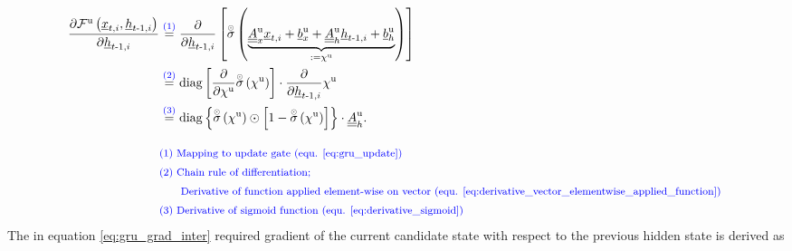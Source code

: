 \begin{align} \label{eq:gru_grad_update_2_previous_hidden} 
    \frac{\partial
    \mathcal{F}^\text{u} \left(\underline x_{t, i}, \underline h_{t\text{-}1, i}\right)
    }{\partial \underline h_{t\text{-}1, i}}
    &\overset{\textcolor{blue}{(1)}}{=}
    \frac{\partial}{\partial \underline h_{t\text{-}1, i}}
    \left[
        \overset{\scriptscriptstyle \odot}{\sigma} \left(
            \underbrace{
            \underline{\underline A}^\text{u}_{x}
            \underline x_{t,i}
            +
            \underline b^\text{u}_{x}
            +
            \underline{\underline A}^\text{u}_{h}
            \underline h_{t\text -1,i}
            +
            \underline b^\text{u}_{h}}_{:=\chi^\text{u}}
        \right)
    \right]
    \nonumber \\ & \overset{\textcolor{blue}{(2)}}{=}
    \mathrm{diag} \left[
        \frac{\partial}{\partial \chi^\text{u}}
        \overset{\scriptscriptstyle \odot}{\sigma} \left(\chi^\text{u}\right)
    \right]
    \cdot \frac{\partial}{\partial \underline h_{t\text{-}1, i}} \chi^\text{u}{}
    \nonumber \\ & \overset{\textcolor{blue}{(3)}}{=}
    \mathrm{diag} \left\{
        \overset{\scriptscriptstyle \odot}{\sigma} \left(\chi^\text{u}\right)
        \odot
        \left[
            1 -  \overset{\scriptscriptstyle \odot}{\sigma} \left(\chi^\text{u}\right)
        \right]
    \right\}
    \cdot \underline{\underline A}^\text{u}_{h}.
    \\[2ex]
        &\textcolor{blue}{\text{\footnotesize (1) 
            Mapping to update gate (equ. \ref{eq:gru_update})}} \nonumber \\
        &\textcolor{blue}{\text{\footnotesize (2) 
            Chain rule of differentiation;
        }} \nonumber \\
        &\textcolor{blue}{\text{\footnotesize \qquad
            Derivative of function applied element-wise on vector
            (equ. \ref{eq:derivative_vector_elementwise_applied_function})
        }} \nonumber \\
        &\textcolor{blue}{\text{\footnotesize (3) 
            Derivative of sigmoid function (equ. \ref{eq:derivative_sigmoid})
        }} \nonumber
\end{align}
The in equation \ref{eq:gru_grad_inter} 
required gradient of the current candidate state
with respect to the previous hidden state is derived as 
